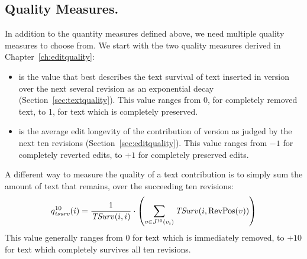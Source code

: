 \subsection{Quality Measures.}

In addition to the quantity measures defined above, we need
multiple quality measures to choose from.
We start with the two quality measures derived in
Chapter~\ref{ch:editquality}:
\begin{itemize}
\item {} is the value that best describes
    the text survival of text inserted in version 
    over the next several revision as an exponential
    decay (Section~\ref{sec:textquality}).
    This value ranges from 0, for completely removed text,
    to 1, for text which is completely preserved.
\item {} is the average edit longevity of
    the contribution of version  as judged by the
    next ten revisions (Section~\ref{sec:editquality}).
    This value ranges from $-1$ for completely reverted edits,
    to $+1$ for completely preserved edits.
\end{itemize}

A different way to measure the quality of a text contribution
is to simply sum the amount of text that remains, over the
succeeding ten revisions:
%
\begin{equation*}
    \quality{tsurv}{10}{i} = \frac{1}{\tsurv{}{i,i}} \cdot
    \left( \sum_{v \in \judges{}{10}{\version{i}}} \tsurv{}{i,\revpos{v}} \right)
\end{equation*}
%
This value generally ranges from $0$ for text which is immediately removed,
to $+10$ for text which completely survives all ten revisions.

